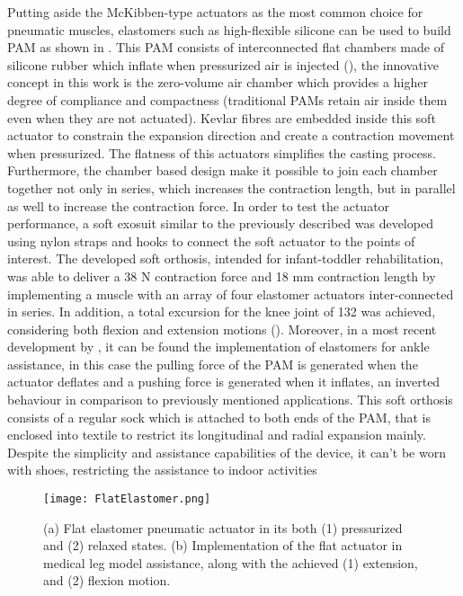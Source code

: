Putting aside the McKibben-type actuators as the most common choice for pneumatic muscles, elastomers such as high-flexible silicone can be used to build PAM as shown in \cite{Park2014}. This PAM consists of interconnected flat chambers made of silicone rubber which inflate when pressurized air is injected (), the innovative concept in this work is the zero-volume air chamber which provides a higher degree of compliance and compactness (traditional PAMs retain air inside them even when they are not actuated). Kevlar fibres are embedded inside this soft actuator to constrain the expansion direction and create a contraction movement when pressurized. The flatness of this actuators simplifies the casting process. Furthermore, the chamber based design make it possible to join each chamber together not only in series, which increases the contraction length, but in parallel as well to increase the contraction force. In order to test the actuator performance, a soft exosuit similar to the previously described was developed using nylon straps and hooks to connect the soft actuator to the points of interest. The developed soft orthosis, intended for infant-toddler rehabilitation, was able to deliver a 38 N contraction force and 18 mm contraction length by implementing a muscle with an array of four elastomer actuators inter-connected in series. In addition, a total excursion for the knee joint of 132\textdegree{} was achieved, considering both flexion and extension motions (). Moreover, in a most recent development by \cite{Low2016}, it can be found the implementation of elastomers for ankle assistance, in this case the pulling force of the PAM is generated when the actuator deflates and a pushing force is generated when it inflates, an inverted behaviour in comparison to previously mentioned applications. This soft orthosis consists of a regular sock which is attached to both ends of the PAM, that is enclosed into textile to restrict its longitudinal and radial expansion mainly. Despite the simplicity and assistance capabilities of the device, it can't be worn with shoes, restricting the assistance to indoor activities
\begin{figure}[hbtp!]
    \centering
    \texttt{[image: FlatElastomer.png]}
    \caption{(a) Flat elastomer pneumatic actuator in its both (1) pressurized and (2) relaxed states. (b) Implementation of the flat actuator in medical leg model assistance, along with the achieved (1) extension, and (2) flexion motion. \cite{Park2014} }
    \label{fig:Flat_elastomer}
\end{figure}

